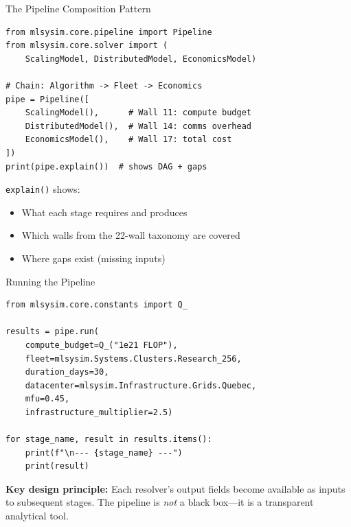 \documentclass[aspectratio=169, 12pt]{beamer}
\begin{document}
\begin{frame}[fragile]{The Pipeline Composition Pattern}
\begin{lstlisting}
from mlsysim.core.pipeline import Pipeline
from mlsysim.core.solver import (
    ScalingModel, DistributedModel, EconomicsModel)

# Chain: Algorithm -> Fleet -> Economics
pipe = Pipeline([
    ScalingModel(),      # Wall 11: compute budget
    DistributedModel(),  # Wall 14: comms overhead
    EconomicsModel(),    # Wall 17: total cost
])
print(pipe.explain())  # shows DAG + gaps
\end{lstlisting}

\vspace{0.5em}
\texttt{explain()} shows:
\begin{itemize}
  \item What each stage requires and produces
  \item Which walls from the 22-wall taxonomy are covered
  \item Where gaps exist (missing inputs)
\end{itemize}
\end{frame}

\begin{frame}[fragile]{Running the Pipeline}
\begin{lstlisting}
from mlsysim.core.constants import Q_

results = pipe.run(
    compute_budget=Q_("1e21 FLOP"),
    fleet=mlsysim.Systems.Clusters.Research_256,
    duration_days=30,
    datacenter=mlsysim.Infrastructure.Grids.Quebec,
    mfu=0.45,
    infrastructure_multiplier=2.5)

for stage_name, result in results.items():
    print(f"\n--- {stage_name} ---")
    print(result)
\end{lstlisting}

\vspace{0.5em}
\textbf{Key design principle:} Each resolver's output fields become available
as inputs to subsequent stages. The pipeline is \emph{not} a black box---it
is a transparent analytical tool.
\end{frame}
\end{document}
